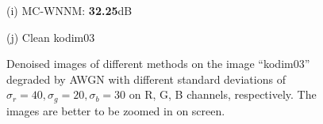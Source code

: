 \documentclass[10pt,onecolumn,letterpaper]{article}
\begin{document}
\begin{figure}
{\begin{minipage}[t]{0.195\textwidth}
{\footnotesize (i) MC-WNNM: \textbf{32.25}dB}
\end{minipage}
\begin{minipage}[t]{0.195\textwidth}
\centering
{}
{\footnotesize (j) Clean kodim03}
\end{minipage}
}
\caption{Denoised images of different methods on the image ``kodim03'' degraded by AWGN with different standard deviations of $\sigma_{r}=40, \sigma_{g}=20, \sigma_{b}=30$ on R, G, B channels, respectively. The images are better to be zoomed in on screen.}
\label{f1}
\vspace{2mm}
\end{figure}
\end{document}
